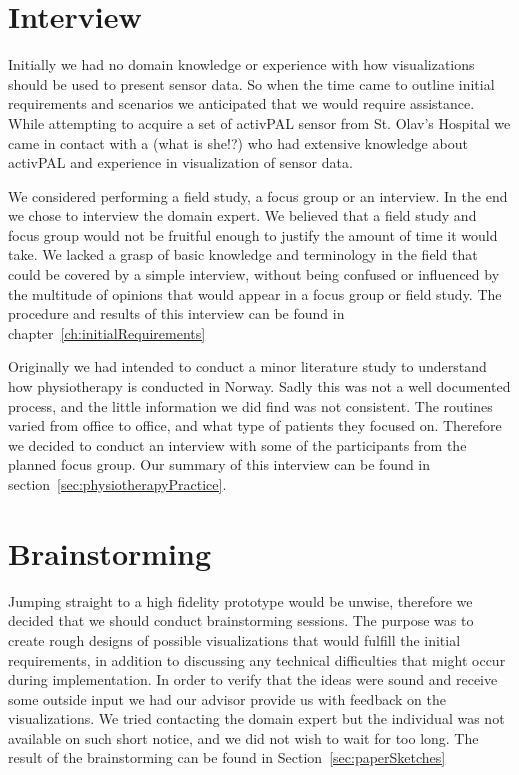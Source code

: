 \section{Interview}
Initially we had no domain knowledge or experience with how visualizations should be used to present sensor data. So when the time came to outline initial requirements and scenarios we anticipated that we would require assistance. While attempting to acquire a set of activPAL sensor from St. Olav's Hospital we came in contact with a (what is she!?) who had extensive knowledge about activPAL and experience in visualization of sensor data. 

We considered performing a field study, a focus group or an interview. In the end we chose to interview the domain expert. We believed that a field study and focus group would not be fruitful enough to justify the amount of time it would take. We lacked a grasp of basic knowledge and terminology in the field that could be covered by a simple interview, without being confused or influenced by the multitude of opinions that would appear in a focus group or field study. The procedure and results of this interview can be found in chapter~\ref{ch:initialRequirements} 

Originally we had intended to conduct a minor literature study to understand how physiotherapy is conducted in Norway. Sadly this was not a well documented process, and the little information we did find was not consistent. The routines varied from office to office, and what type of patients they focused on. Therefore we decided to conduct an interview with some of the participants from the planned focus group. Our summary of this interview can be found in section~\ref{sec:physiotherapyPractice}.
 
\section{Brainstorming}
Jumping straight to a high fidelity prototype would be unwise, therefore we decided that we should conduct brainstorming sessions. The purpose was to create rough designs of possible visualizations that would fulfill the initial requirements, in addition to discussing any technical difficulties that might occur during implementation. In order to verify that the ideas were sound and receive some outside input we had our advisor provide us with feedback on the visualizations. We tried contacting the domain expert but the individual was not available on such short notice, and we did not wish to wait for too long. The result of the brainstorming can be found in Section~\ref{sec:paperSketches}

